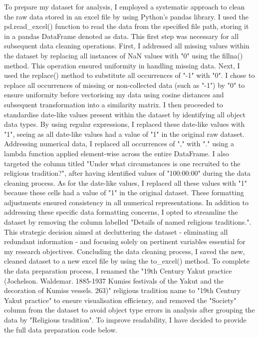 \documentclass[12pt]{report}
\begin{document}
	To prepare my dataset for analysis, I employed a systematic approach to clean the raw data stored in an excel file by using Python’s pandas library. I used the pd.read\_excel() function to read the data from the specified file path, storing it in a pandas DataFrame denoted as data. This first step was necessary for all subsequent data cleaning operations. First, I addressed all missing values within the dataset by replacing all instances of NaN values with "0" using the fillna() method. This operation ensured uniformity in handling missing data. Next, I used the replace() method to substitute all occurrences of "-1" with "0". I chose to replace all occurrences of missing or non-collected data (such as "-1") by "0" to ensure uniformity before vectorising my data using cosine distances and subsequent transformation into a similarity matrix. I then proceeded to standardise date-like values present within the dataset by identifying all object data types. By using regular expressions, I replaced these date-like values with "1", seeing as all date-like values had a value of "1" in the original raw dataset. Addressing numerical data, I replaced all occurrences of "," with "." using a lambda function applied element-wise across the entire DataFrame. I also targeted the column titled "Under what circumstances is one recruited to the religious tradition?", after having identified values of "100:00:00" during the data cleaning process. As for the date-like values, I replaced all these values with "1" because these cells had a value of "1" in the original dataset. These formatting adjustments ensured consistency in all numerical representations. In addition to addressing these specific data formatting concerns, I opted to streamline the dataset by removing the column labelled "Details of named religious traditions.". This strategic decision aimed at decluttering the dataset - eliminating all redundant information - and focusing solely on pertinent variables essential for my research objectives. Concluding the data cleaning process, I saved the new, cleaned dataset to a new excel file by using the to\_excel() method. To complete the data preparation process, I renamed the "19th Century Yakut practice (Jochelson. Waldemar. 1885-1937 Kumiss festivals of the Yakut and the decoration of Kumiss vessels. 263)" religious tradition name to "19th Century Yakut practice" to ensure visualisation efficiency, and removed the "Society" column from the dataset to avoid object type errors in analysis after grouping the data by "Religious tradition". To improve readability, I have decided to provide the full data preparation code below. \\
	
\end{document}
